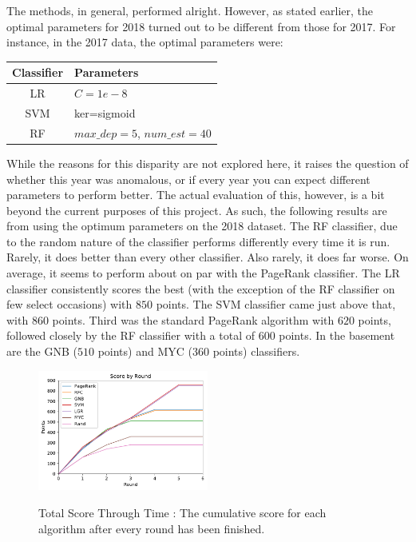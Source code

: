The methods, in general, performed alright.  
However, as stated earlier, the optimal parameters for 2018 turned out to be different from those for 2017.  
For instance, in the 2017 data, the optimal parameters were:\newline\newline
\begin{tabular}{|c|l|}
\hline
Classifier & Parameters \\
\hline
LR & $C=1e-8$ \\
SVM & ker=sigmoid \\
RF & $max\_dep=5$, $num\_est=40$ \\
\hline
\end{tabular} \newline\newline
While the reasons for this disparity are not explored here, it raises the question of whether this year was anomalous, or if every year you can expect different parameters to perform better.  
The actual evaluation of this, however, is a bit beyond the current purposes of this project.  
As such, the following results are from using the optimum parameters on the 2018 dataset.  
The RF classifier, due to the random nature of the classifier performs differently every time it is run.  
Rarely, it does better than every other classifier.  
Also rarely, it does far worse.  
On average, it seems to perform about on par with the PageRank classifier.  
The LR classifier consistently scores the best (with the exception of the RF classifier on few select occasions) with $850$ points.  
The SVM classifier came just above that, with $860$ points.  
Third was the standard PageRank algorithm with $620$ points, followed closely by the RF classifier with a total of $600$ points.    
In the basement are the GNB ($510$ points) and MYC ($360$ points) classifiers.  
\begin{figure}
\centering
\caption{Total Score Through Time : The cumulative score for each algorithm after every round has been finished.}
\includegraphics[width=0.5\textwidth]{../Current_Scores.pdf}
\label{fig:scores1}
\end{figure}
